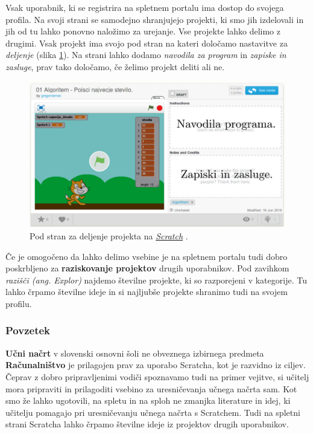 Vsak uporabnik, ki se registrira na spletnem portalu ima dostop do
svojega profila. Na svoji strani se samodejno shranjujejo projekti, ki
smo jih izdelovali in jih od tu lahko ponovno naložimo za
urejanje. Vse projekte lahko delimo z drugimi. Vsak projekt ima svojo
pod stran na kateri določamo nastavitve za \emph{deljenje} (slika
\ref{fig:web:scratch:deljenje}). Na strani lahko dodamo \emph{navodila
  za program} in \emph{zapiske in zasluge}, prav tako določamo, če
želimo projekt deliti ali ne.

\begin{figure}[h!]
  \centering
    \includegraphics [width=0.50\linewidth, keepaspectratio =
   1] {./images/sc_web/scratch_deljenje-v01o.jpg}
   \caption{Pod stran za deljenje projekta na
     \emph{\href{https://scratch.mit.edu/}{Scratch}}
     \cite{web:scratch}.}
    \label{fig:web:scratch:deljenje}
\end{figure}

Če je omogočeno da lahko delimo vsebine je na spletnem portalu tudi
dobro poskrbljeno za \textbf{raziskovanje projektov} drugih
uporabnikov. Pod zavihkom \emph{razišči (ang. Explor)} najdemo
številne projekte, ki so razporejeni v kategorije. Tu lahko črpamo
številne ideje in si najljubše projekte shranimo tudi na svojem
profilu.

\subsubsection{Povzetek}
\label{sec:scratch_povzetek}

\textbf{Učni načrt} v slovenski osnovni šoli ne obveznega izbirnega
predmeta \textbf{Računalništvo} je prilagojen prav za uporabo
Scratcha, kot je razvidno iz ciljev. Čeprav z dobro pripravljenimi
vodiči spoznavamo tudi na primer vejitve, si učitelj mora pripraviti
in prilagoditi vsebino za uresničevanja učnega načrta sam. Kot smo že
lahko ugotovili, na spletu in na sploh ne zmanjka literature in idej,
ki učitelju pomagajo pri uresničevanju učnega načrta s Scratchem. Tudi
na spletni strani Scratcha lahko črpamo številne ideje iz projektov
drugih uporabnikov.

